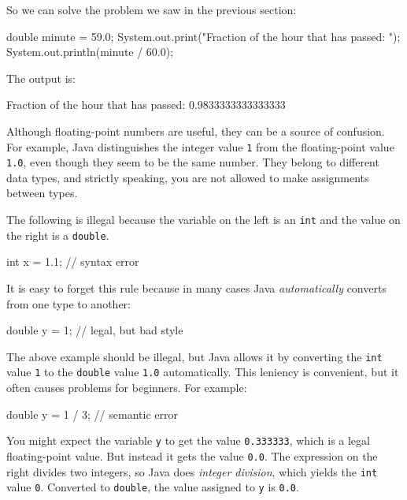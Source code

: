 \documentclass[12pt]{book}
\theoremstyle{exercise}
\newcommand{\java}[1]{\verb"#1"}
\begin{document}
So we can solve the problem we saw in the previous section:

\begin{code}
    double minute = 59.0;
    System.out.print("Fraction of the hour that has passed: ");
    System.out.println(minute / 60.0);
\end{code}

The output is:

\begin{stdout}
Fraction of the hour that has passed: 0.9833333333333333
\end{stdout}

Although floating-point numbers are useful, they can be a source of confusion.
For example, Java distinguishes the integer value \java{1} from the floating-point value \java{1.0}, even though they seem to be the same number.
They belong to different data types, and strictly speaking, you are not allowed to make assignments between types.

The following is illegal because the variable on the left is an \java{int} and the value on the right is a \java{double}.

\begin{code}
    int x = 1.1;  // syntax error
\end{code}

It is easy to forget this rule because in many cases Java {\em automatically} converts from one type to another:

\begin{code}
    double y = 1;  // legal, but bad style
\end{code}

The above example should be illegal, but Java allows it by converting the \java{int} value \java{1} to the \java{double} value \java{1.0} automatically.
This leniency is convenient, but it often causes problems for beginners.
For example:

\begin{code}
    double y = 1 / 3;  // semantic error
\end{code}


You might expect the variable \java{y} to get the value \java{0.333333}, which is a legal floating-point value.
But instead it gets the value \java{0.0}.
The expression on the right divides two integers, so Java does {\em integer division}, which yields the \java{int} value \java{0}.
Converted to \java{double}, the value assigned to \java{y} is \java{0.0}.
\end{document}
